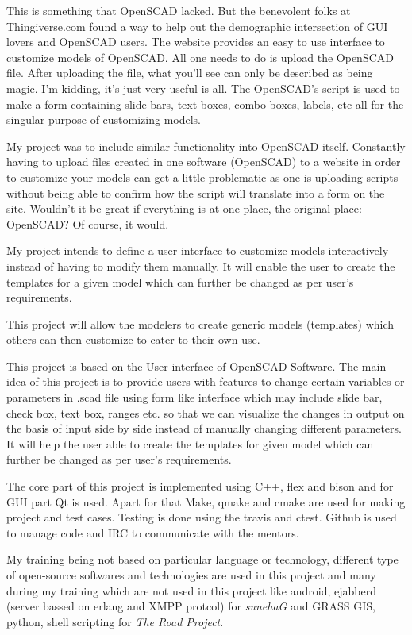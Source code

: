 This is something that OpenSCAD lacked. But the benevolent folks at Thingiverse.com found a way to help out the demographic intersection of GUI lovers and OpenSCAD users. The website provides an easy to use interface to customize models of OpenSCAD. All one needs to do is upload the OpenSCAD file. After uploading the file, what you’ll see can only be described as being magic. I’m kidding, it’s just very useful is all. The OpenSCAD’s script is used to make a form containing slide bars, text boxes, combo boxes, labels, etc all for the singular purpose of customizing models.

My project was to include similar functionality into OpenSCAD itself. Constantly having to upload files created in one software (OpenSCAD) to a website in order to customize your models can get a little problematic as one is uploading scripts without being able to confirm how the script will translate into a form on the site. Wouldn’t it be great if everything is at one place, the original place: OpenSCAD? Of course, it would.

My project intends to define a user interface to customize models interactively instead of having to modify them manually. It will enable the user to create the templates for a given model which can further be changed as per user’s requirements.

This project will allow the modelers to create generic models (templates) which others can then customize to cater to their own use.

This project is based on the User interface of OpenSCAD Software. The main idea of this project is to provide users with features to change certain variables or parameters in .scad file using form like interface which may include slide bar, check box, text box, ranges etc. so that we can visualize the changes in output on the basis of input side by side instead of manually changing different parameters. It will help the user able to create the templates for given model which can further be changed as per user's requirements. 

The core part of this project is implemented using C++, flex and bison and for GUI part Qt is used. Apart for that Make, qmake and cmake are used for making project and test cases.
Testing is done using the travis and ctest. Github is used to manage code and IRC to communicate with the mentors.
  
My training being not based on particular language or technology, different type of open-source softwares and technologies are 
used in this project and many during my training which are not used in this 
project like android, ejabberd (server bassed on erlang and XMPP protcol) for\emph{ sunehaG} and GRASS GIS, python, shell scripting for \emph{The Road Project}.
